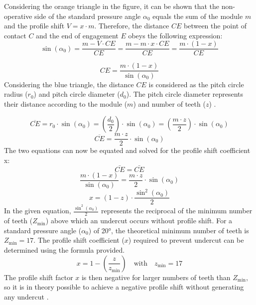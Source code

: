 \documentclass{article}
\begin{document}
Considering the orange triangle in the figure, it can be shown that the non-operative side of the standard pressure angle \( \alpha_0 \) equals the sum of the module \( m \) and the profile shift \( V = x \cdot m \). Therefore, the distance \( CE \) between the point of contact \( C \) and the end of engagement \( E \) obeys the following expression:
\begin{equation}
    \sin(\alpha_0) = \frac{m - V \cdot CE}{CE} = \frac{m - m \cdot x \cdot CE}{CE} = \frac{m \cdot (1 - x)}{CE}
\end{equation}

\begin{equation}
   CE = \frac{m \cdot (1 - x)}{\sin(\alpha_0)}
\end{equation}
Considering the blue triangle, the distance \( CE \) is considered as the pitch circle radius (\( r_0 \)) and pitch circle diameter (\( d_0 \)). The pitch circle diameter represents their distance according to the module (\( m \)) and number of teeth (\( z \)) \cite{Profileshift-of-Involute-Gears5}.
 
\begin{equation}
    \overline{CE} = r_0 \cdot \sin(\alpha_0) = \left(\frac{d_0}{2}\right) \cdot \sin(\alpha_0) = \left(\frac{m \cdot z}{2}\right) \cdot \sin(\alpha_0)
\end{equation}
\begin{equation}
    \overline{CE} = \frac{m \cdot z}{2} \cdot \sin(\alpha_0)
\end{equation}
The two equations can now be equated and solved for the profile shift coefficient x:
\begin{equation}
    \bar{CE}=\bar{CE}
\end{equation}
\begin{equation}
    \frac{m \cdot (1-x)}{\sin(\alpha_0)} = \frac{m \cdot z}{2} \cdot \sin(\alpha_0)
\end{equation}
\begin{equation}
    x = (1 - z) \cdot \frac{\sin^2(\alpha_0)}{2}
\end{equation}
In the given equation, \( \frac{\sin^2(\alpha_0)}{2} \) represents the reciprocal of the minimum number of teeth (\( Z_{\text{min}} \)) above which an undercut occurs without profile shift. For a standard pressure angle (\( \alpha_0 \)) of 20°, the theoretical minimum number of teeth is \( Z_{\text{min}} = 17 \). The profile shift coefficient (\( x \)) required to prevent undercut can be determined using the formula provided.
\begin{equation}
    x= 1 - \left(\frac{z}{z_{\mathrm{min}}}\right) \quad \text{with} \quad z_{\mathrm{min}} = 17
\end{equation}
The profile shift factor \( x \) is then negative for larger numbers of teeth than \( Z_{\text{min}} \), so it is in theory possible to achieve a negative profile shift without generating any undercut \cite{Profileshift-of-Involute-Gears5}.
\newpage
\end{document}
